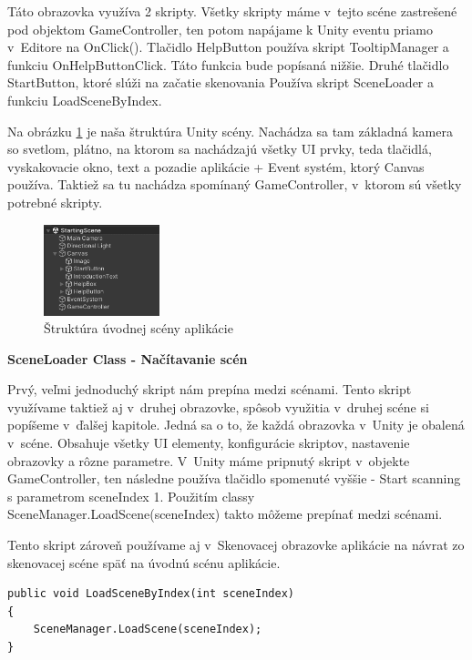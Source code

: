 
Táto obrazovka využíva 2 skripty. Všetky skripty máme v~tejto scéne zastrešené pod objektom GameController, ten potom napájame k Unity eventu priamo v~Editore na OnClick(). Tlačidlo HelpButton používa skript TooltipManager a funkciu OnHelpButtonClick. Táto funkcia bude popísaná nižšie. Druhé tlačidlo StartButton, ktoré slúži na začatie skenovania Používa skript SceneLoader a funkciu LoadSceneByIndex. 

Na obrázku \ref{fig:introductionSceneStructure} je naša štruktúra Unity scény. Nachádza sa tam základná kamera so svetlom, plátno, na ktorom sa nachádzajú všetky UI prvky, teda tlačidlá, vyskakovacie okno, text a pozadie aplikácie + Event systém, ktorý Canvas používa. Taktiež sa tu nachádza spomínaný GameController, v~ktorom sú všetky potrebné skripty.  

\begin{figure}[h]
  \centering
  \includegraphics[width=0.3\textwidth]{img/structure_introduction.png}
  \caption{Štruktúra úvodnej scény aplikácie}
  \label{fig:introductionSceneStructure}
\end{figure}

{\normalsize\textbf{SceneLoader Class - Načítavanie scén}}

Prvý, veľmi jednoduchý skript nám prepína medzi scénami. Tento skript využívame taktiež aj v~druhej obrazovke, spôsob využitia v~druhej scéne si popíšeme v~ďalšej kapitole. Jedná sa o to, že každá obrazovka v~Unity je obalená v~scéne. Obsahuje všetky UI elementy, konfigurácie skriptov, nastavenie obrazovky a rôzne parametre. V~Unity máme pripnutý skript v~objekte GameController, ten následne používa tlačidlo spomenuté vyššie - Start scanning s parametrom sceneIndex 1. Použitím classy SceneManager.LoadScene(sceneIndex) takto môžeme prepínať medzi scénami. %

Tento skript zároveň používame aj v~Skenovacej obrazovke aplikácie na návrat zo skenovacej scéne späť na úvodnú scénu aplikácie.

\lstset{style=Csharp}
\begin{lstlisting}[caption={SceneLoader Class - Načítavanie scén}, label=sceneLoader]
public void LoadSceneByIndex(int sceneIndex)
{
    SceneManager.LoadScene(sceneIndex);
}
\end{lstlisting}

